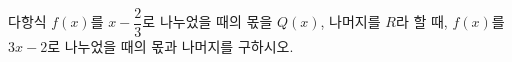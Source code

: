 다항식 $f(x)$를 $x-\dfrac{2}{3}$로 나누었을 때의 몫을 $Q(x)$, 나머지를 $R$라 할 때, $f(x)$를 $3x-2$로 나누었을 때의 몫과 나머지를 구하시오.
